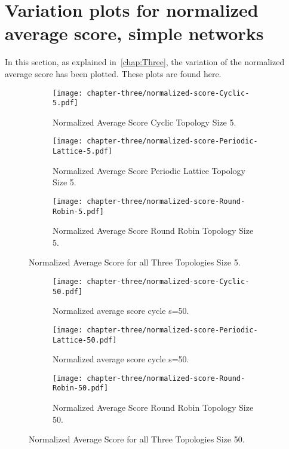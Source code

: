 \section{Variation plots for normalized average score, simple networks}
\label{append:variation-plots}
In this section, as explained in~\ref{chap:Three}, the variation of the
normalized average score has been plotted. These plots are found here.

\begin{figure}[h]
\centering
    \begin{subfigure}[t]{0.8\textwidth}
    \centering
        \texttt{[image: chapter-three/normalized-score-Cyclic-5.pdf]}
    \caption{Normalized Average Score Cyclic Topology Size 5.}
    \end{subfigure}
\hfill
    \begin{subfigure}[t]{0.8\textwidth}\centering
    \centering
        \texttt{[image: chapter-three/normalized-score-Periodic-Lattice-5.pdf]}
    \caption{Normalized Average Score Periodic Lattice Topology Size 5.}
    \end{subfigure}
\hfill
    \begin{subfigure}[t]{0.8\textwidth}\centering
    \centering
        \texttt{[image: chapter-three/normalized-score-Round-Robin-5.pdf]}
    \caption{Normalized Average Score Round Robin Topology Size 5.}
    \end{subfigure}
\caption{Normalized Average Score for all Three Topologies Size 5.}
\label{fig:average-score-five}
\end{figure}

\begin{figure}[h]
\centering
    \begin{subfigure}[t]{1\textwidth}
    \centering
        \texttt{[image: chapter-three/normalized-score-Cyclic-50.pdf]}
    \caption{Normalized average score cycle s=50.}
    \end{subfigure}
\hfill
    \begin{subfigure}[t]{1\textwidth}\centering
    \centering
        \texttt{[image: chapter-three/normalized-score-Periodic-Lattice-50.pdf]}
    \caption{Normalized average score cycle s=50.}
    \end{subfigure}
\hfill
    \begin{subfigure}[t]{1\textwidth}\centering
    \centering
        \texttt{[image: chapter-three/normalized-score-Round-Robin-50.pdf]}
    \caption{Normalized Average Score Round Robin Topology Size 50.}
    \end{subfigure}
\caption{Normalized Average Score for all Three Topologies Size 50.}
\label{fig:average-score-fifty}
\end{figure}
